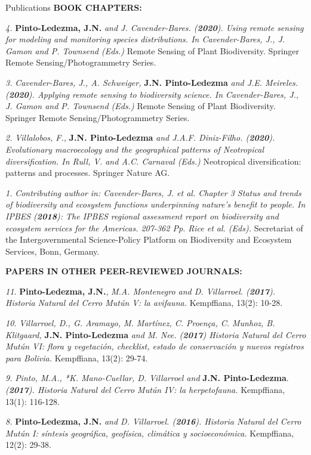 \documentclass{resume} %
\begin{document}
\begin{rSection}{Publications}
{\bf BOOK CHAPTERS:}

{\em 4.} {\bf{Pinto-Ledezma, J.N.}} {\em and J. Cavender-Bares. ({{\bf 2020}}). Using remote sensing for modeling and monitoring species distributions. In Cavender-Bares, J., J. Gamon and P. Townsend (Eds.)} {Remote Sensing of Plant Biodiversity. Springer Remote Sensing/Photogrammetry Series}.

{\em 3.} {\em Cavender-Bares, J., A. Schweiger,} {\bf{J.N. Pinto-Ledezma}} {\em and J.E. Meireles. ({{\bf 2020}}). Applying remote sensing to biodiversity science. In Cavender-Bares, J., J. Gamon and P. Townsend (Eds.)} {Remote Sensing of Plant Biodiversity. Springer Remote Sensing/Photogrammetry Series}. 

{\em 2.} {\em Villalobos, F.,} {\bf{J.N. Pinto-Ledezma}} {\em and J.A.F. Diniz-Filho. ({{\bf 2020}}). Evolutionary macroecology and the geographical patterns of Neotropical diversification. In Rull, V. and A.C. Carnaval (Eds.)} {Neotropical diversification: patterns and processes. Springer Nature AG}. 

{\em 1.} {\em Contributing author in: Cavender-Bares, J. et al. Chapter 3 Status and trends of biodiversity and ecosystem functions underpinning nature’s benefit to people. In IPBES ({{\bf 2018}}): {\em The IPBES regional assessment report on biodiversity and ecosystem services for the Americas}. 207-362 Pp. Rice et al. (Eds).} {Secretariat of the Intergovernmental Science-Policy Platform on Biodiversity and Ecosystem Services, Bonn, Germany}. 

{\bf PAPERS IN OTHER PEER-REVIEWED JOURNALS:} 

{\em 11.} {\bf{Pinto-Ledezma, J.N.}}, {\em M.A. Montenegro and D. Villarroel. ({{\bf 2017}}). Historia Natural del Cerro Mutún V: la avifauna.} {Kempffiana, 13(2): 10-28}.

{\em 10.} {\em Villarroel, D., G. Aramayo, M. Martínez, C. Proença, C. Munhoz, B. Klitgaard,} {\bf{J.N. Pinto-Ledezma}} {\em and M. Nee. ({{\bf 2017}}) Historia Natural del Cerro Mutún VI: flora y vegetación, checklist, estado de conservación y nuevos registros para Bolivia.} {Kempffiana, 13(2): 29-74}.

{\em 9.} {\em *Pinto, M.A., *K. Mano-Cuellar, D. Villarroel and} {\bf{J.N. Pinto-Ledezma}}. {\em ({{\bf 2017}}). Historia Natural del Cerro Mutún IV: la herpetofauna.} {Kempffiana, 13(1): 116-128}.

{\em 8.} {\bf{Pinto-Ledezma, J.N.}} {\em and D. Villarroel. ({{\bf 2016}}). Historia Natural del Cerro Mutún I: síntesis geográfica, geofísica, climática y socioeconómica.} {Kempffiana, 12(2): 29-38}.


\end{rSection}
\end{document}
